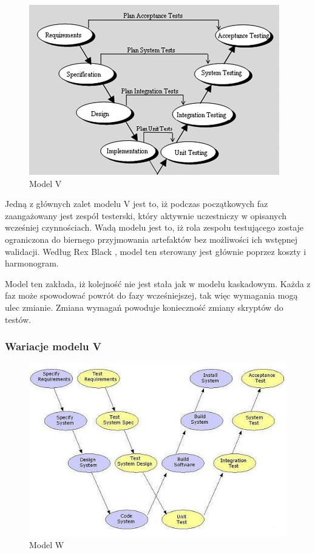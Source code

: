 \begin{figure}[h]
\centerline{\includegraphics[scale=0.7]{img/vmodel.png}}
\caption{Model V \cite{otss}}
\label{fig:vmodel}
\end{figure}

Jedną z głównych zalet modelu V jest to, iż podczas początkowych faz zaangażowany jest zespół testerski, który aktywnie uczestniczy w opisanych wcześniej czynnościach. Wadą modelu jest to, iż rola zespołu testującego zostaje ograniczona do biernego przyjmowania artefaktów bez możliwości ich wstępnej walidacji.  Według Rex Black \cite{Fund}, model ten sterowany jest głównie poprzez koszty i harmonogram.

Model ten zakłada, iż kolejność nie jest stała jak w modelu kaskadowym. Każda z faz może spowodować powrót do fazy wcześniejszej, tak więc wymagania mogą ulec zmianie. Zmiana wymagań powoduje konieczność zmiany skryptów do testów.

\subsubsection{Wariacje modelu V}
\begin{figure}[h]
\centerline{\includegraphics[scale=0.5]{img/Wmodel3.JPG}}
\caption{Model W  \cite{wmodel}}
\label{fig:wmodel}
\end{figure}

